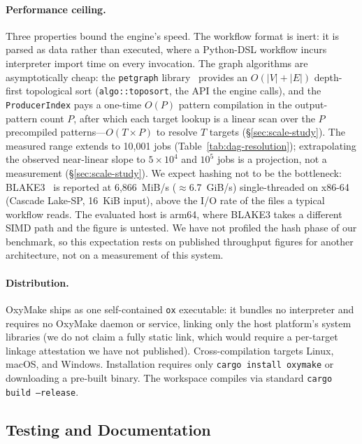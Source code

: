 \documentclass[12pt,a4paper]{article}
\newcommand{\code}[1]{{\texttt{\small\color{inlinecode}#1}}}
\begin{document}
\paragraph{Performance ceiling.}
Three properties bound the engine's speed. The workflow format is
inert: it is parsed as data rather than executed, where a Python-DSL
workflow incurs interpreter import time on every invocation. The graph algorithms
are asymptotically cheap: the \code{petgraph} library~\cite{petgraph}
provides an $O(|V|+|E|)$ depth-first topological sort
(\code{algo::toposort}, the API the engine calls), and the
\code{ProducerIndex} pays a one-time $O(P)$ pattern compilation in the
output-pattern count $P$, after which each target lookup is a linear
scan over the $P$ precompiled patterns---$O(T \times P)$ to resolve $T$
targets (\S\ref{sec:scale-study}).
The measured range extends to 10{,}001 jobs
(Table~\ref{tab:dag-resolution}); extrapolating the observed near-linear
slope to $5\times10^4$ and $10^5$ jobs is a projection, not a
measurement (\S\ref{sec:scale-study}). We expect hashing not to
be the bottleneck: BLAKE3~\cite{blake3,blake3spec} is reported at
6{,}866~MiB/s ($\approx$6.7~GiB/s) single-threaded on x86-64
(Cascade Lake-SP, 16~KiB input),
above the I/O rate of the files a typical workflow reads. The evaluated
host is arm64, where BLAKE3 takes a different SIMD path and the figure
is untested. We have not
profiled the hash phase of our benchmark, so this expectation rests on
published throughput figures for another architecture, not on a
measurement of this system.

\paragraph{Distribution.}
OxyMake ships as one self-contained \code{ox} executable: it bundles no
interpreter and requires no OxyMake daemon or service, linking only the
host platform's system libraries (we do not claim a fully static link,
which would require a per-target linkage attestation we have not
published). Cross-compilation targets Linux, macOS, and Windows. Installation requires
only \code{cargo install oxymake} or downloading a pre-built binary.
The workspace compiles via standard \code{cargo build --release}.

\subsection{Testing and Documentation}
\label{sec:methodology}
\end{document}
